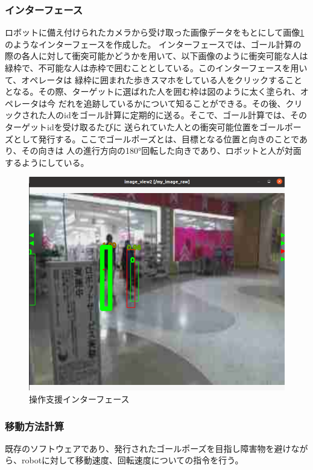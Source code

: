 \documentclass[11pt,a4j]{jreport}
\begin{document}
\subsubsection{インターフェース}
ロボットに備え付けられたカメラから受け取った画像データをもとにして画像\ref{pic:interface}のようなインターフェースを作成した。
インターフェースでは、ゴール計算の際の各人に対して衝突可能かどうかを用いて、以下画像のように衝突可能な人は緑枠で、不可能な人は赤枠で囲むこととしている。このインターフェースを用いて、オペレータは
緑枠に囲まれた歩きスマホをしている人をクリックすることとなる。その際、ターゲットに選ばれた人を囲む枠は図のように太く塗られ、オペレータは今
だれを追跡しているかについて知ることができる。その後、クリックされた人のidをゴール計算に定期的に送る。そこで、ゴール計算では、そのターゲットidを受け取るたびに
送られていた人との衝突可能位置をゴールポーズとして発行する。ここでゴールポーズとは、目標となる位置と向きのことであり、その向きは
人の進行方向の180°回転した向きであり、ロボットと人が対面するようにしている。
\begin{figure}[H]
  
  \includegraphics[width=15cm]{img/interface.png}
  \caption{操作支援インターフェース}
  \label{pic:interface}
\end{figure}
\subsubsection{移動方法計算}
既存のソフトウェアであり、発行されたゴールポーズを目指し障害物を避けながら、robotに対して移動速度、回転速度についての指令を行う。
\end{document}
